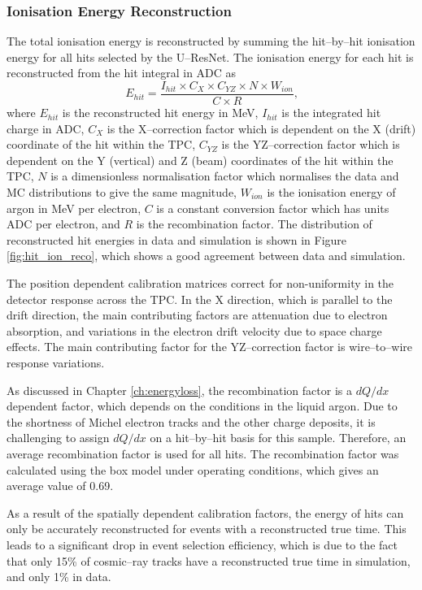 \subsubsection{Ionisation Energy Reconstruction}

The total ionisation energy is reconstructed by summing the hit--by--hit
ionisation energy for all hits selected by the U--ResNet. The ionisation energy for
each hit is reconstructed from the hit integral in ADC as
\begin{equation*}
	E_{hit} = \frac{I_{hit} \times C_X \times C_{YZ} \times N \times W_{ion}}{C \times R}\mbox{,}
\end{equation*}
where $E_{hit}$ is the reconstructed hit energy in MeV, $I_{hit}$ is the
integrated hit charge in ADC, $C_X$ is the X--correction factor which is
dependent on the X (drift) coordinate of the hit within the TPC, $C_{YZ}$ is the
YZ--correction factor which is dependent on the Y (vertical) and Z (beam) 
coordinates of the hit within the TPC, $N$ is a dimensionless normalisation 
factor which normalises the data and MC distributions to give the same 
magnitude, $W_{ion}$ is the ionisation energy of argon in MeV per electron, 
$C$ is a constant conversion factor which has units ADC per electron, and $R$ 
is the recombination factor. The distribution of reconstructed hit energies in 
\protodune{} data and simulation is shown in Figure \ref{fig:hit_ion_reco}, 
which shows a good agreement between data and simulation.

The position dependent calibration matrices correct for non-uniformity in the
detector response across the TPC. In the X direction, which is parallel to the
drift direction, the main contributing factors are attenuation due to electron
absorption, and variations in the electron drift velocity due to space charge
effects. The main contributing factor for the YZ--correction factor is
wire--to--wire response variations.

As discussed in Chapter \ref{ch:energyloss}, the recombination factor is a
$dQ/dx$ dependent factor, which depends on the conditions in the liquid
argon. Due to the shortness of Michel electron tracks and the other charge
deposits, it is challenging to assign $dQ/dx$ on a hit--by--hit basis for this
sample. Therefore, an average recombination factor is used for all hits. The
recombination factor was calculated using the box model\cite{Acciarri2013a}
under \protodune{} operating conditions, which gives an average value of 0.69.

As a result of the spatially dependent calibration factors, the energy of hits
can only be accurately reconstructed for events with a reconstructed true
time. This leads to a significant drop in event selection efficiency, which is
due to the fact that only 15\% of cosmic--ray tracks have a reconstructed true
time in simulation, and only 1\% in data.

